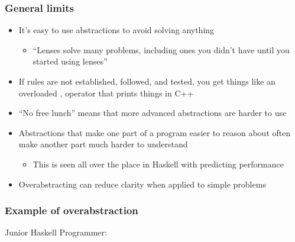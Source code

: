 \documentclass{beamer}
\begin{document}
\begin{frame}
\frametitle{General limits}
  \begin{itemize}
    \item It's easy to use abstractions to avoid solving anything 
      \begin{itemize}
        \item ``Lenses solve many problems, including ones you didn't have until you started using lenses''
      \end{itemize}
    \item If rules are not established, followed, and tested, you get things like an overloaded , operator that prints things in C++
    \item ``No free lunch'' means that more advanced abstractions are harder to use
    \item Abstractions that make one part of a program easier to reason about often make another part much harder to understand
      \begin{itemize}
        \item This is seen all over the place in Haskell with predicting performance
      \end{itemize}
    \item Overabstracting can reduce clarity when applied to simple problems 
  \end{itemize}
\end{frame}


\begin{frame}
\frametitle{Example of overabstraction}
Junior Haskell Programmer:








\end{frame}
\end{document}
